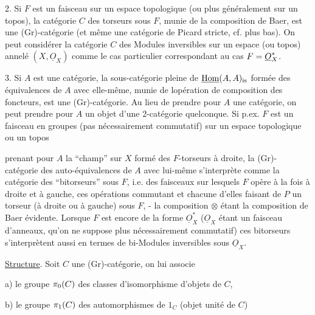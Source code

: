  2. Si $F$ est un faisceau sur un espace topologique (ou plus généralement sur un topos), la catégorie $C$ des torseurs sous $F$, munie de la composition de Baer, est une (Gr)-catégorie (et même une catégorie de Picard stricte, cf. plus bas). On peut considérer la catégorie $C$ des Modules inversibles sur un espace (ou topos)  annelé  $(X,\underline{O}_{X})$ comme le cas particulier correspondant au cas $F=\underline{O}_{X}^{*}$.

 3. Si $A$ est une catégorie, la sous-catégorie pleine  de $\underline{\mathrm{Hom}}(A,A)_{\mathrm{is}}$ formée des équivalences de $A$ avec elle-même, munie de lopération de composition des foncteurs, est une (Gr)-catégorie. Au lieu de prendre pour $A$ une catégorie, on peut  prendre pour $A$ un objet d'une 2-catégorie quelconque. Si p.ex. $F$ est un faisceau en groupes (pas nécessairement commutatif) sur un espace topologique \handwritten{(}ou un topos\handwritten{)}\handwritten{,}


prenant pour $A$ la ``champ'' sur $X$ formé des $F$-torseurs à droite, la (Gr)- catégorie des auto-équivalences de $A$ avec lui-même s'interprète comme la catégorie des ``bitorseurs'' sous $F$, i.e. des faisceaux  sur lesquels $F$ opère à la fois à droite et à gauche, ces opérations commutant et chacune d'elles faisant de $P$ un torseur (à droite ou à gauche) sous $F$, - la composition $\otimes$ étant la composition de Baer évidente. Lorsque $F$ est encore de la forme $\underline{O}_{X}^{*}$ ($\underline{O}_{X}$ étant un faisceau d'anneaux, qu'on ne suppose plus nécessairement commutatif) ces bitorseurs s'interprètent aussi en termes de bi-Modules inversibles sous $\underline{O}_{X}$.

\uline{Structure}.  Soit $C$ une (Gr)-catégorie, on lui associe

a) le groupe $\pi_{0}(C)$ des classes d'isomorphisme d'objets de $C$,

b) le groupe $\pi_{1}(C)$ des automorphismes de $1_C$ (objet unité de $C$)

